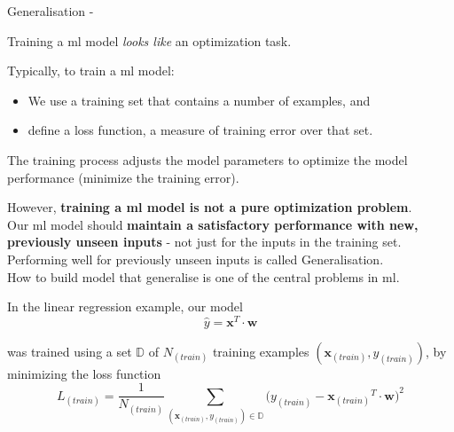 
\begin{frame}[t,allowframebreaks]{Generalisation -}

    Training a \gls{ml} model {\em looks like} an optimization task.\\
    \vspace{0.1cm}
    \begin{blockexample}{}
      Typically, to train a \gls{ml} model: 
      \begin{itemize}
        \item 
        We use a \gls{training set} 
        that contains a number of examples, and
        \item
        define a \gls{loss function},
        a measure of training error over that set.
      \end{itemize}
      The training process adjusts the model parameters
      to optimize the model performance (minimize the training error).\\
    \end{blockexample}
    \vspace{0.2cm}
    However, {\bf training a \gls{ml} model is not a pure optimization problem}.\\
    \vspace{0.2cm}
    Our \gls{ml} model should {\bf maintain a satisfactory performance 
    with new, previously unseen inputs} - 
    not just for the inputs in the training set.\\
    \vspace{0.2cm}
    Performing well for previously unseen inputs is called 
    \gls{Generalisation}.\\
    \vspace{0.2cm}
    How to build model that generalise is one of the central problems in \gls{ml}.


    \framebreak


    In the linear regression example, our model
    \begin{equation}
        \hat{y} = {\mathbf x}^T \cdot {\mathbf w}
    \end{equation}        

    was trained using a set $\mathbb{D}$ of $N_{(train)}$
    training examples $({\mathbf x_{(train)}},y_{(train)})$, 
    by minimizing the loss function
    \begin{equation}
        L_{(train)} = \frac{1}{N_{(train)}} 
        \sum_{({\mathbf x_{(train)}},y_{(train)})  \in \mathbb{D}}
        \Big( y_{(train)} - {\mathbf x_{(train)}}^T \cdot {\mathbf w} \Big)^2
    \end{equation}        


\end{frame}
